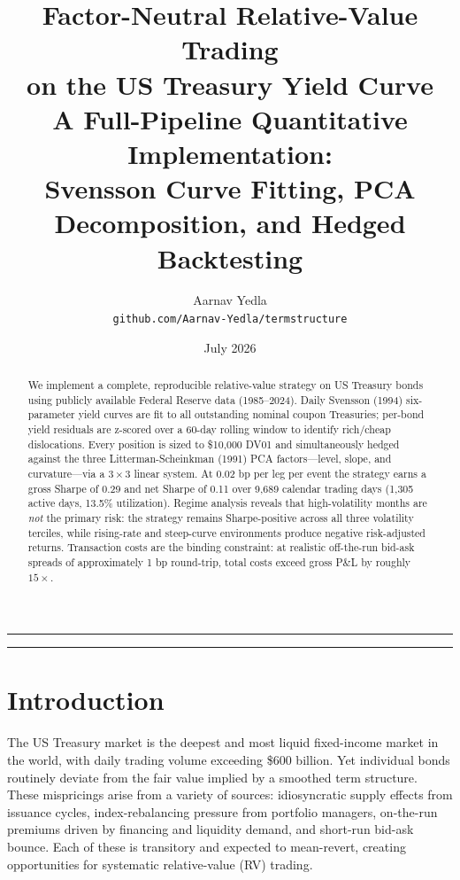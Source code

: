 \documentclass[11pt]{article}
\title{\textbf{Factor-Neutral Relative-Value Trading\\
       on the US Treasury Yield Curve}\\[6pt]
\large A Full-Pipeline Quantitative Implementation:\\
Svensson Curve Fitting, PCA Decomposition, and Hedged Backtesting}
\author{Aarnav Yedla\\[4pt]
\small \texttt{github.com/Aarnav-Yedla/termstructure}}
\date{\small July 2026}
\begin{document}
\maketitle
\vspace{-6pt}
\hrule
\vspace{6pt}

\begin{abstract}
\noindent
We implement a complete, reproducible relative-value strategy on US Treasury
bonds using publicly available Federal Reserve data (1985--2024). Daily
Svensson (1994) six-parameter yield curves are fit to all outstanding nominal
coupon Treasuries; per-bond yield residuals are z-scored over a 60-day rolling
window to identify rich/cheap dislocations. Every position is sized to
\$10{,}000 DV01 and simultaneously hedged against the three Litterman-Scheinkman
(1991) PCA factors---level, slope, and curvature---via a $3 \times 3$ linear
system. At 0.02 bp per leg per event the strategy earns a gross Sharpe of 0.29
and net Sharpe of 0.11 over 9,689 calendar trading days (1,305 active days,
13.5\% utilization). Regime analysis reveals that high-volatility months are
\emph{not} the primary risk: the strategy remains Sharpe-positive across all
three volatility terciles, while rising-rate and steep-curve environments
produce negative risk-adjusted returns. Transaction costs are the binding
constraint: at realistic off-the-run bid-ask spreads of approximately 1 bp
round-trip, total costs exceed gross P\&L by roughly $15\times$.
\end{abstract}

\hrule
\vspace{6pt}

\section{Introduction}

The US Treasury market is the deepest and most liquid fixed-income market in
the world, with daily trading volume exceeding \$600 billion. Yet individual
bonds routinely deviate from the fair value implied by a smoothed term
structure. These mispricings arise from a variety of sources: idiosyncratic
supply effects from issuance cycles, index-rebalancing pressure from portfolio
managers, on-the-run premiums driven by financing and liquidity demand, and
short-run bid-ask bounce. Each of these is transitory and expected to
mean-revert, creating opportunities for systematic relative-value (RV) trading.
\end{document}
